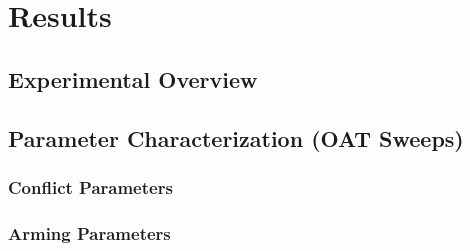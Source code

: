 \chapter{Results} %
\label{Results}


\section{Experimental Overview}

\section{Parameter Characterization (OAT Sweeps)}

\subsection{Conflict Parameters}

\subsection{Arming Parameters}

